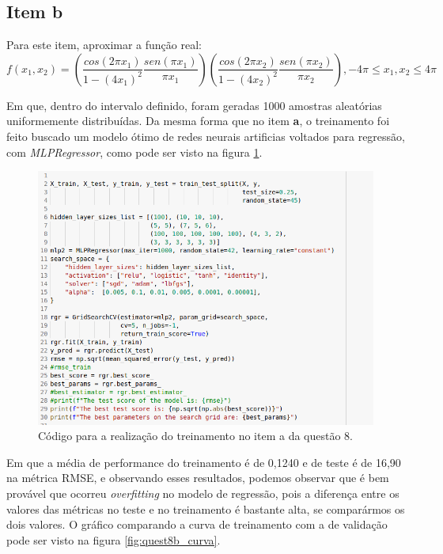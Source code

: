 \documentclass[a4paper, 12pt]{article}
\begin{document}
\subsection{Item b}

Para este item, aproximar a função real:
\begin{equation}\label{eq:quest8b_function}
f(x_1, x_2) = \left(\frac{cos(2\pi x_1)}{1-(4x_1)^2} \frac{sen(\pi x_1)}{\pi x_1} \right)\left(\frac{cos(2\pi x_2)}{1-(4x_2)^2} \frac{sen(\pi x_2)}{\pi x_2}\right), -4\pi \leq x_1, x_2 \leq 4\pi
\end{equation}

Em que, dentro do intervalo definido, foram geradas 1000 amostras aleatórias uniformemente distribuídas. Da mesma forma que no item \textbf{a}, o treinamento foi feito buscado um modelo ótimo de redes neurais artificias voltados para regressão, com \textit{MLPRegressor}, como pode ser visto na figura \ref{fig:quest8b_train}.

\begin{figure}[h]
	\centering
 	\includegraphics[width=0.9\linewidth]{figuras/quest8b_train.png}
    \caption{Código para a realização do treinamento no item a da questão 8.}
    \label{fig:quest8b_train}
\end{figure}
\FloatBarrier

Em que a média de performance do treinamento é de 0,1240 e de teste é de 16,90 na métrica RMSE, e observando esses resultados, podemos observar que é bem provável que ocorreu \textit{overfitting} no modelo de regressão, pois a diferença entre os valores das métricas no teste e no treinamento é bastante alta, se comparármos os dois valores. O gráfico comparando a curva de treinamento com a de validação pode ser visto na figura \ref{fig:quest8b_curva}.
\end{document}
